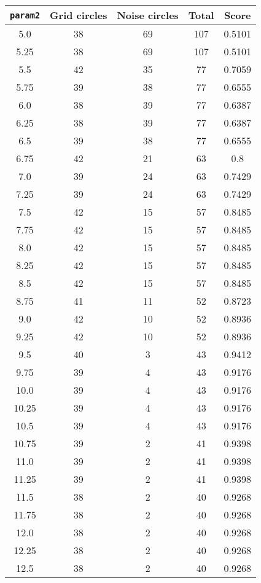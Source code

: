 \documentclass[letterpaper, 12pt]{article}
\begin{document}
\begin{longtable}{|c|c|c|c|c|}
\hline
\textbf{\texttt{param2}} & \textbf{Grid circles} & \textbf{Noise circles} & \textbf{Total} & \textbf{Score} \\
\hline
5.0 & 38 & 69 & 107 & 0.5101 \\
\hline
5.25 & 38 & 69 & 107 & 0.5101 \\
\hline
5.5 & 42 & 35 & 77 & 0.7059 \\
\hline
5.75 & 39 & 38 & 77 & 0.6555 \\
\hline
6.0 & 38 & 39 & 77 & 0.6387 \\
\hline
6.25 & 38 & 39 & 77 & 0.6387 \\
\hline
6.5 & 39 & 38 & 77 & 0.6555 \\
\hline
6.75 & 42 & 21 & 63 & 0.8 \\
\hline
7.0 & 39 & 24 & 63 & 0.7429 \\
\hline
7.25 & 39 & 24 & 63 & 0.7429 \\
\hline
7.5 & 42 & 15 & 57 & 0.8485 \\
\hline
7.75 & 42 & 15 & 57 & 0.8485 \\
\hline
8.0 & 42 & 15 & 57 & 0.8485 \\
\hline
8.25 & 42 & 15 & 57 & 0.8485 \\
\hline
8.5 & 42 & 15 & 57 & 0.8485 \\
\hline
8.75 & 41 & 11 & 52 & 0.8723 \\
\hline
9.0 & 42 & 10 & 52 & 0.8936 \\
\hline
9.25 & 42 & 10 & 52 & 0.8936 \\
\hline
9.5 & 40 & 3 & 43 & 0.9412 \\
\hline
9.75 & 39 & 4 & 43 & 0.9176 \\
\hline
10.0 & 39 & 4 & 43 & 0.9176 \\
\hline
10.25 & 39 & 4 & 43 & 0.9176 \\
\hline
10.5 & 39 & 4 & 43 & 0.9176 \\
\hline
10.75 & 39 & 2 & 41 & 0.9398 \\
\hline
11.0 & 39 & 2 & 41 & 0.9398 \\
\hline
11.25 & 39 & 2 & 41 & 0.9398 \\
\hline
11.5 & 38 & 2 & 40 & 0.9268 \\
\hline
11.75 & 38 & 2 & 40 & 0.9268 \\
\hline
12.0 & 38 & 2 & 40 & 0.9268 \\
\hline
12.25 & 38 & 2 & 40 & 0.9268 \\
\hline
12.5 & 38 & 2 & 40 & 0.9268 \\

\end{longtable}
\end{document}
